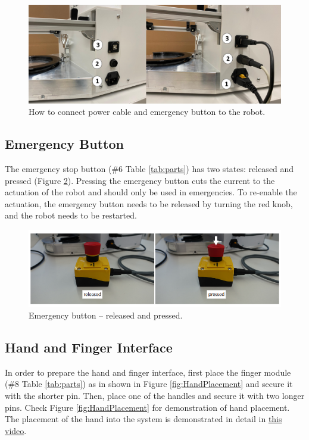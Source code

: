 \documentclass[10pt,oneside,a4paper]{article}
\begin{document}
\begin{figure}[h!]
\begin{center}
\includegraphics[width=\columnwidth]{images/Hardware/CablesBoth.png}
\caption{How to connect power cable and emergency button to the robot.}
\label{fig:cables}
\end{center}
\end{figure}

\subsection{Emergency Button}
The emergency stop button (\#6 Table \ref{tab:parts}) has two states: released and pressed (Figure \ref{fig:EmergencyButton}). Pressing the emergency button cuts the current to the actuation of the robot and should only be used in emergencies. To re-enable the actuation, the emergency button needs to be released by turning the red knob, and the robot needs to be restarted. 

\begin{figure}[h!]
\begin{center}
\includegraphics[width=\columnwidth]{images/Hardware/EmergencyButton.png}
\caption{Emergency button – released and pressed.}
\label{fig:EmergencyButton}
\end{center}
\end{figure}

\subsection{Hand and Finger Interface}
In order to prepare the hand and finger interface, first place the finger module (\#8 Table \ref{tab:parts}) as in shown in Figure \ref{fig:HandPlacement} and secure it with the shorter pin. Then, place one of the handles and secure it with two longer pins. Check Figure \ref{fig:HandPlacement} for demonstration of hand placement. The placement of the hand into the system is demonstrated in detail in \href{https://www.youtube.com/watch?v=jmWdwJ00onU&t=1s&ab_channel=RELABETHZ}{this video}. 
\end{document}
